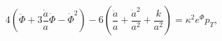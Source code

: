 \begin{equation}
4\left(\ddot\Phi+3\frac{\dot a}{a}\dot\Phi-\dot\Phi^2\right)
-6\left(\frac{\ddot a}{a}+\frac{\dot a^2}{a^2}+\frac{k}{a^2}\right) = 
\kappa^2 e^\Phi p_{T},
\label{dilaton3}
\end{equation}

